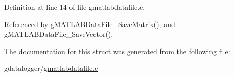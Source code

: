 Definition at line 14 of file gmatlabdatafile.c.



Referenced by gMATLABDataFile\_\-SaveMatrix(), and gMATLABDataFile\_\-SaveVector().



The documentation for this struct was generated from the following file:\begin{DoxyCompactItemize}
\item 
gdatalogger/\hyperlink{gmatlabdatafile_8c}{gmatlabdatafile.c}\end{DoxyCompactItemize}
